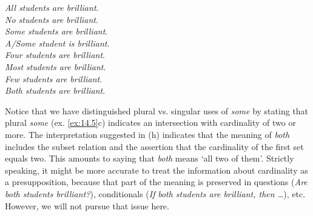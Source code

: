 \ea \label{ex:14.5}
\ea   \textit{All students are brilliant}.\\ 
\ex  \textit{No students are brilliant}. \\ 
\ex  \textit{Some students are brilliant}.\\ 
\ex \textit{A/Some student is brilliant}.\\ 
\ex  \textit{Four students are brilliant}.\\ 
\ex  \textit{Most students are brilliant}.\\ 
\ex   \textit{Few students are brilliant}.\\ 
\ex   \textit{Both students are brilliant}.\\ 
\z \z
{}

Notice that we have distinguished plural vs. singular uses of \textit{some} by stating that plural \textit{some} (ex. \ref{ex:14.5}c) indicates an intersection with cardinality of two or more. The interpretation suggested in (h) indicates that the meaning of \textit{both} includes the subset relation and the assertion that the cardinality of the first set equals two. This amounts to saying that \textit{both} means ‘all two of them’. Strictly speaking, it might be more accurate to treat the information about cardinality as a presupposition, because that part of the meaning is preserved in questions (\textit{Are} \textit{both students brilliant?}), conditionals (\textit{If} \textit{both students are brilliant, then …}), etc. However, we will not pursue that issue here.




